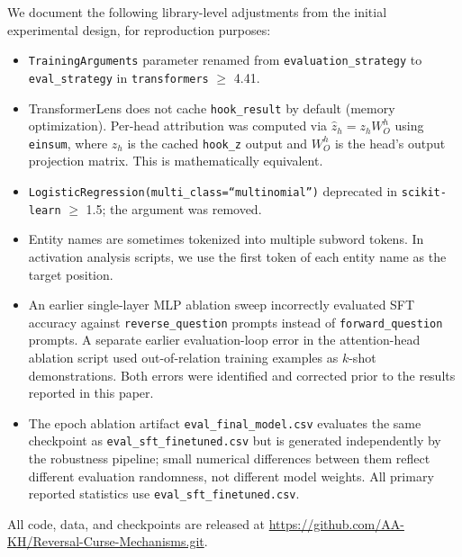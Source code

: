 \documentclass[11pt]{article}
\begin{document}
We document the following library-level adjustments from the initial
experimental design, for reproduction purposes:

\begin{itemize}
  \item \texttt{TrainingArguments} parameter renamed from
  \texttt{evaluation\_strategy} to \texttt{eval\_strategy} in
  \texttt{transformers} $\geq$ 4.41.

  \item TransformerLens does not cache \texttt{hook\_result} by default
  (memory optimization). Per-head attribution was computed via
  $\hat{z}_h = z_h W_O^h$ using \texttt{einsum}, where $z_h$ is the cached
  \texttt{hook\_z} output and $W_O^h$ is the head's output projection matrix.
  This is mathematically equivalent.

  \item \texttt{LogisticRegression(multi\_class=``multinomial'')} deprecated
  in \texttt{scikit-learn} $\geq$ 1.5; the argument was removed.

  \item Entity names are sometimes tokenized into multiple subword tokens.
  In activation analysis scripts, we use the first token of each entity
  name as the target position.

  \item An earlier single-layer MLP ablation sweep incorrectly evaluated SFT
  accuracy against \texttt{reverse\_question} prompts instead of
  \texttt{forward\_question} prompts. A separate earlier evaluation-loop error
  in the attention-head ablation script used out-of-relation training examples
  as $k$-shot demonstrations. Both errors were identified and corrected prior to
  the results reported in this paper.

  \item The epoch ablation artifact \texttt{eval\_final\_model.csv} evaluates
  the same checkpoint as \texttt{eval\_sft\_finetuned.csv} but is generated
  independently by the robustness pipeline; small numerical differences between
  them reflect different evaluation randomness, not different model weights.
  All primary reported statistics use \texttt{eval\_sft\_finetuned.csv}.
\end{itemize}

All code, data, and checkpoints are released at
\url{https://github.com/AA-KH/Reversal-Curse-Mechanisms.git}.
\end{document}
